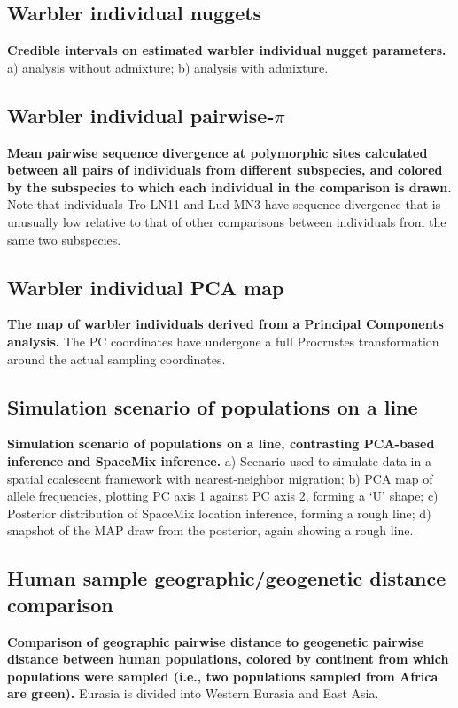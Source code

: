 \documentclass[10pt,letterpaper]{article}
\begin{document}
\subsection*{Warbler individual nuggets}
\label{warb_ind_nugg}
{\bf{Credible intervals on estimated warbler individual nugget parameters. }} a) analysis without admixture; b) analysis with admixture.

\subsection*{Warbler individual pairwise-$\pi$}
\label{warb_ind_pwp}
{\bf{Mean pairwise sequence divergence at polymorphic sites calculated between all pairs of individuals from different subspecies, and colored by the subspecies to which each individual in the comparison is drawn.}} Note that individuals Tro-LN11 and Lud-MN3 have sequence divergence that is unusually low relative to that of other comparisons between individuals from the same two subspecies.

\subsection*{Warbler individual PCA map}
\label{warb_ind_PC_map}
{\bf{The map of warbler individuals derived from a Principal Components analysis.}} The PC coordinates have undergone a full Procrustes transformation around the actual sampling coordinates.

\subsection*{Simulation scenario of populations on a line}
\label{line_scenario}
{\bf{Simulation scenario of populations on a line, contrasting PCA-based inference and SpaceMix inference.}} a) Scenario used to simulate data in a spatial coalescent framework with nearest-neighbor migration; b) PCA map of allele frequencies, plotting PC axis 1 against PC axis 2, forming a `U' shape; c) Posterior distribution of SpaceMix location inference, forming a rough line; d) snapshot of the MAP draw from the posterior, again showing a rough line.

\subsection*{Human sample geographic/geogenetic distance comparison}
\label{globe_noad_distcomp}
{\bf{Comparison of geographic pairwise distance to geogenetic pairwise distance between human populations, colored by continent from which populations were sampled (i.e., two populations sampled from Africa are green).}} Eurasia is divided into Western Eurasia and East Asia.
\end{document}
